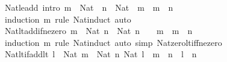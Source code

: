 \begin{isabellebody}
\isanewline
{}\isamarkupfalse%
\ Nat{\isacharunderscore}{\kern0pt}le{\isacharunderscore}{\kern0pt}add\ {\isacharbrackleft}{\kern0pt}intro{\isacharbrackright}{\kern0pt}{\isacharcolon}{\kern0pt}\ {\isachardoublequoteopen}m\ {\isacharcolon}{\kern0pt}\ Nat\ {\isasymLongrightarrow}\ n\ {\isacharcolon}{\kern0pt}\ Nat\ {\isasymLongrightarrow}\ m\ {\isasymle}\ m\ {\isacharplus}{\kern0pt}\ n{\isachardoublequoteclose}\isanewline
%
\isadelimproof
\ \ %
\endisadelimproof
%
\isatagproof
{}\isamarkupfalse%
\ {\isacharparenleft}{\kern0pt}induction\ m\ rule{\isacharcolon}{\kern0pt}\ Nat{\isacharunderscore}{\kern0pt}induct{\isacharparenright}{\kern0pt}\ auto%
\endisatagproof
{\isafoldproof}%
%
\isadelimproof
\isanewline
%
\endisadelimproof
\isanewline
{}\isamarkupfalse%
\ Nat{\isacharunderscore}{\kern0pt}lt{\isacharunderscore}{\kern0pt}add{\isacharunderscore}{\kern0pt}if{\isacharunderscore}{\kern0pt}ne{\isacharunderscore}{\kern0pt}zero{\isacharcolon}{\kern0pt}\ {\isachardoublequoteopen}{\isasymlbrakk}m\ {\isacharcolon}{\kern0pt}\ Nat{\isacharsemicolon}{\kern0pt}\ n\ {\isacharcolon}{\kern0pt}\ Nat{\isacharsemicolon}{\kern0pt}\ n\ {\isasymnoteq}\ {}{\isasymrbrakk}\ {\isasymLongrightarrow}\ m\ {\isacharless}{\kern0pt}\ m\ {\isacharplus}{\kern0pt}\ n{\isachardoublequoteclose}\isanewline
%
\isadelimproof
\ \ %
\endisadelimproof
%
\isatagproof
{}\isamarkupfalse%
\ {\isacharparenleft}{\kern0pt}induction\ m\ rule{\isacharcolon}{\kern0pt}\ Nat{\isacharunderscore}{\kern0pt}induct{\isacharparenright}{\kern0pt}\ {\isacharparenleft}{\kern0pt}auto\ simp{\isacharcolon}{\kern0pt}\ Nat{\isacharunderscore}{\kern0pt}zero{\isacharunderscore}{\kern0pt}lt{\isacharunderscore}{\kern0pt}iff{\isacharunderscore}{\kern0pt}ne{\isacharunderscore}{\kern0pt}zero{\isacharparenright}{\kern0pt}%
\endisatagproof
{\isafoldproof}%
%
\isadelimproof
\isanewline
%
\endisadelimproof
\isanewline
{}\isamarkupfalse%
\ Nat{\isacharunderscore}{\kern0pt}lt{\isacharunderscore}{\kern0pt}if{\isacharunderscore}{\kern0pt}add{\isacharunderscore}{\kern0pt}lt{\isacharcolon}{\kern0pt}\ {\isachardoublequoteopen}{\isasymlbrakk}l\ {\isacharcolon}{\kern0pt}\ Nat{\isacharsemicolon}{\kern0pt}\ m\ {\isacharcolon}{\kern0pt}\ Nat{\isacharsemicolon}{\kern0pt}\ n{\isacharcolon}{\kern0pt}\ Nat{\isacharsemicolon}{\kern0pt}\ l\ {\isacharplus}{\kern0pt}\ m\ {\isacharless}{\kern0pt}\ n{\isasymrbrakk}\ {\isasymLongrightarrow}\ l\ {\isacharless}{\kern0pt}\ n{\isachardoublequoteclose}\isanewline
%
\isadelimproof
\ \ %
\endisadelimproof
%
\isatagproof
{}\isamarkupfalse%

\end{isabellebody}
